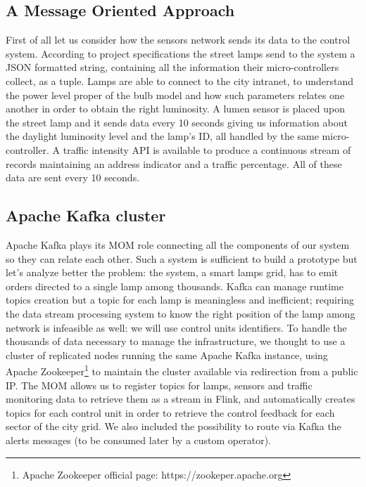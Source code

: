 \subsection{A Message Oriented Approach}
First of all let us consider how the sensors network sends its data to the control system. According to project specifications the street lamps send to the system a JSON formatted string, containing all the information their micro-controllers collect, as a tuple. Lamps are able to connect to the city intranet, to understand the power level proper of the bulb model and how such parameters relates one another in order to obtain the right luminosity.
 A lumen sensor is placed upon the street lamp and it sends data every 10 seconds giving us information about the daylight luminosity level and the lamp's ID, all handled by the same micro-controller.
 A traffic intensity API is available to produce a continuous stream of records maintaining an address indicator and a traffic percentage. All of these data are sent every 10 seconds.

\subsection{Apache Kafka cluster}
 Apache Kafka plays its MOM role connecting all the components of our system so they can relate each other. Such a system is sufficient to build a prototype but let’s analyze better the problem: the system, a smart lamps grid, has to emit orders directed to a single lamp among thousands. Kafka can manage runtime topics creation but a topic for each lamp is meaningless and inefficient; requiring the data stream processing system to know the right position of the lamp among network is infeasible as well: we will use control units identifiers.
To handle the thousands of data necessary to manage the infrastructure, we thought to use a cluster of replicated nodes running the same Apache Kafka instance, using Apache Zookeeper\footnote{Apache Zookeeper official page: https://zookeper.apache.org} to maintain the cluster available via redirection from a public IP. The MOM allows us to register topics for lamps, sensors and traffic monitoring data to retrieve them as a stream in Flink, and automatically creates topics for each control unit in order to retrieve the control feedback for each sector of the city grid. We also included the possibility to route via Kafka the alerts messages (to be consumed later by a custom operator).

